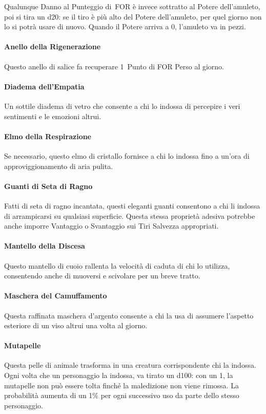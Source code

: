 \documentclass[itdr]{subfiles}
\begin{document}
Qualunque Danno al Punteggio di~FOR è invece sottratto al Potere dell'amuleto, poi si tira un d20: se il tiro è più alto del Potere dell'amuleto, per quel giorno non lo si potrà usare di nuovo. Quando il Potere arriva a 0, l'amuleto va in pezzi.

\vfill
\paragraph{Anello della Rigenerazione}
Questo anello di salice fa recuperare 1~Punto di FOR Perso al giorno.

\vfill
\paragraph{Diadema dell'Empatia}
Un sottile diadema di vetro che consente a chi lo indossa di percepire i veri sentimenti e le emozioni altrui.

\vfill
\paragraph{Elmo della Respirazione}
Se necessario, questo elmo di cristallo fornisce a chi lo indossa fino a un'ora di approviggionamento di aria pulita.

\vfill
\paragraph{Guanti di Seta di Ragno}
Fatti di seta di ragno incantata, questi eleganti guanti consentono a chi li indossa di arrampicarsi su qualsiasi superficie. Questa stessa proprietà adesiva potrebbe anche imporre Vantaggio o Svantaggio sui Tiri Salvezza appropriati.

\vfill
\paragraph{Mantello della Discesa}
Questo mantello di cuoio rallenta la velocità di caduta di chi lo utilizza, consentendo anche di muoversi e scivolare per un breve tratto.

\vfill
\paragraph{Maschera del Camuffamento}
Questa raffinata maschera d'argento consente a chi la usa di assumere l'aspetto esteriore di un \mbox{viso} altrui una volta al giorno.

\vfill
\paragraph{Mutapelle}
Questa pelle di animale trasforma in una creatura corrispondente chi la indossa. Ogni volta che un personaggio la indossa, va tirato un d100: con un 1, la mutapelle non può essere tolta finché la maledizione non viene rimossa. La probabilità aumenta di un 1\% per ogni successivo uso da parte dello stesso personaggio.
\end{document}
